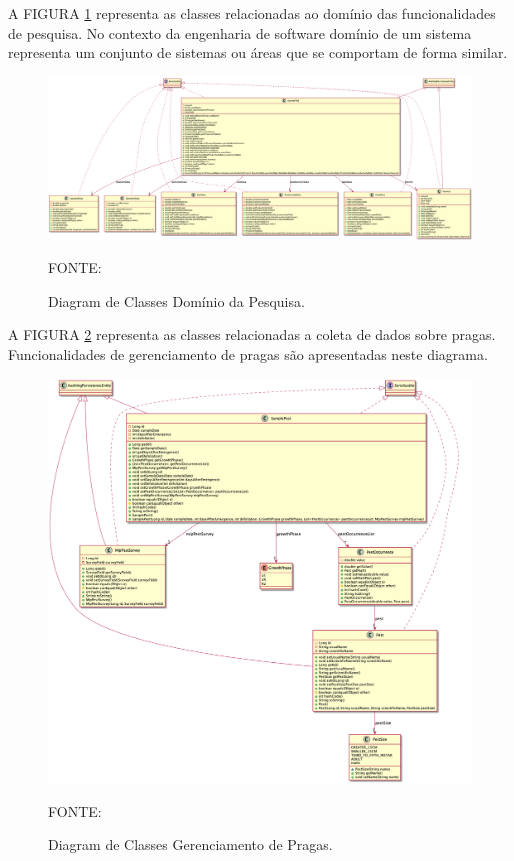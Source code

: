 \begin{landscape}
A FIGURA \ref{domain-survey} representa as classes relacionadas ao domínio das funcionalidades de pesquisa. No contexto da engenharia de software domínio de um sistema representa um conjunto de sistemas ou áreas que se comportam de forma similar.

\begin{figure}[h!]
	\includegraphics[scale=0.3]{dados/figuras/domain-survey-classes.png}
	\caption{Diagram de Classes Domínio da Pesquisa.}
	FONTE: \cite[https:~//github.com/gabrielcostasilva/emater-mip-datacollection-app/tree/DDDLike/mip/src/main/resources/UMLDiagrams]{gabriel}
	\label{domain-survey}
\end{figure}
\end{landscape}



A FIGURA \ref{domain-pest} representa as classes relacionadas a coleta de dados sobre pragas. Funcionalidades de gerenciamento de pragas são apresentadas neste diagrama. 

\begin{figure}[h!]
	\centering
	\includegraphics[scale=0.35]{dados/figuras/domain-mip-classes.png}
	\caption{Diagram de Classes Gerenciamento de Pragas.} 
	FONTE: \cite[https:~//github.com/gabrielcostasilva/emater-mip-datacollection-app/tree/DDDLike/mip/src/main/resources/UMLDiagrams]{gabriel}
	\label{domain-pest}
\end{figure}



